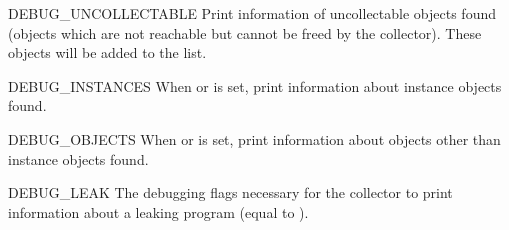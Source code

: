 \begin{datadesc}{DEBUG_UNCOLLECTABLE}
Print information of uncollectable objects found (objects which are
not reachable but cannot be freed by the collector).  These objects
will be added to the  list.
\end{datadesc}

\begin{datadesc}{DEBUG_INSTANCES}
When  or  is
set, print information about instance objects found.
\end{datadesc}

\begin{datadesc}{DEBUG_OBJECTS}
When  or  is
set, print information about objects other than instance objects found.
\end{datadesc}

\begin{datadesc}{DEBUG_LEAK}
The debugging flags necessary for the collector to print
information about a leaking program (equal to ).  
\end{datadesc}
